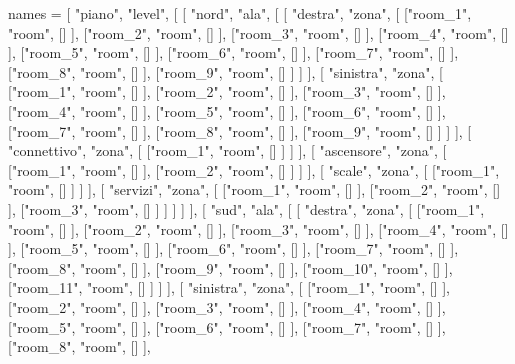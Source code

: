 names = [ 
			"piano",
            "level",
			[
				[
					"nord",
                    "ala",
					[
						[
							"destra",
                            "zona",
							[
								["room_1", "room", [] ],
								["room_2", "room", [] ],
								["room_3", "room", [] ],
								["room_4", "room", [] ],
								["room_5", "room", [] ],
								["room_6", "room", [] ],
								["room_7", "room", [] ],
								["room_8", "room", [] ],
								["room_9", "room", [] ]
							] 
						],
           				[
           					"sinistra",
                            "zona",
           					[
								["room_1", "room", [] ],
								["room_2", "room", [] ],
								["room_3", "room", [] ],
								["room_4", "room", [] ],
								["room_5", "room", [] ],
								["room_6", "room", [] ],
								["room_7", "room", [] ],
								["room_8", "room", [] ],
								["room_9", "room", [] ]
           					]
           				],
           				[
           					"connettivo",
                            "zona",
           					[
           						["room_1", "room", [] ]
           					]
           				],
           				[
           					"ascensore",
                            "zona",
           					[
           						["room_1", "room", [] ],
           						["room_2", "room", [] ]
           					]
           				],
          				[
          					"scale",
                            "zona",
          					[
          						["room_1", "room", [] ]
          					]
          				],
           				[
           					"servizi",
                            "zona",
           					[
           						["room_1", "room", [] ],
           						["room_2", "room", [] ],
           						["room_3", "room", [] ]
           					]												
						]
					]
				],
				[
					"sud",
                    "ala",
					[
						[
							"destra",
                            "zona",
							[
								["room_1", "room", [] ],
								["room_2", "room", [] ],
								["room_3", "room", [] ],
								["room_4", "room", [] ],
								["room_5", "room", [] ],
								["room_6", "room", [] ],
								["room_7", "room", [] ],
								["room_8", "room", [] ],
								["room_9", "room", [] ],
								["room_10", "room", [] ],
								["room_11", "room", [] ]
							] 
						],
           				[
           					"sinistra",
                            "zona",
           					[
								["room_1", "room", [] ],
								["room_2", "room", [] ],
								["room_3", "room", [] ],
								["room_4", "room", [] ],
								["room_5", "room", [] ],
								["room_6", "room", [] ],
								["room_7", "room", [] ],
								["room_8", "room", [] ],

